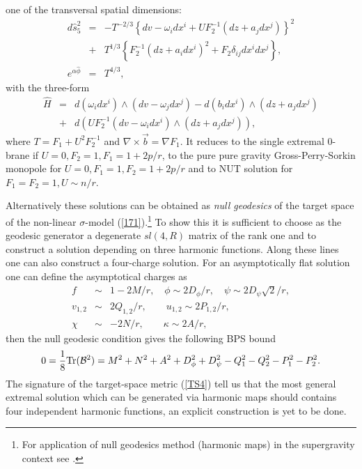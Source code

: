 \documentclass[a4paper,12pt]{article}
\def\Tr{{\rm Tr}}
\begin{document}
one of the transversal spatial dimensions:
\begin{eqnarray}
d\hat s_{5}^2 &=& -T^{-2/3} \left\{ dv - \omega_i dx^i + U
F_2^{-1}(dz + a_j dx^j) \right\}^2 \nonumber\\
&+& T^{1/3} \left\{ F_2^{-1} (dz + a_i dx^i)^2 + F_2 \delta_{ij}
dx^i dx^j \right\}, \\
e^{\alpha\hat\phi} &=& T^{4/3}, \label{NMK}
\end{eqnarray}
with the three-form
\begin{eqnarray}
\hat H &=& d (\omega_i dx^i) \wedge (dv - \omega_j dx^j) - d (b_i
dx^i) \wedge (dz + a_j dx^j) \nonumber \\
&+& d \left( U F_2^{-1} (dv - \omega_i dx^i) \wedge (dz + a_j
dx^j) \right),
\end{eqnarray}
where $T=F_1+U^2F_2^{-1}$ and $\nabla \times \vec b = \nabla
F_1$. It reduces to the single extremal $0$-brane if $U=0,
F_2=1, F_1=1+2p/r$, to the pure pure gravity Gross-Perry-Sorkin
monopole for $U=0, F_1=1, F_2=1+2p/r$ and to NUT solution for
$F_1=F_2=1, U\sim n/r$.

Alternatively these solutions can be obtained as {\it null
geodesics} of the target space of the non-linear $\sigma$-model
(\ref{171}).\footnote{For application of null geodesics method
(harmonic maps) in the supergravity context see
\cite{GaRy98,ClGa96}.} To show this it is sufficient to choose as
the geodesic generator a degenerate $sl(4,R)$ matrix of the rank
one and to construct a solution depending on three harmonic
functions. Along these lines one can also construct a four-charge
solution. For an asymptotically flat solution one can define the
asymptotical charges as
\begin{eqnarray}
f &\sim& 1-2M/r, \quad \phi \sim 2D_\phi/r, \quad
\psi \sim 2D_\psi\sqrt{2}/r, \nonumber\\
v_{1,2} &\sim& 2Q_{1,2}/r, \qquad u_{1,2} \sim 2P_{1,2}/r, \\
\chi &\sim& -2N/r, \qquad \kappa \sim 2A/r, \nonumber
\end{eqnarray}
then the null geodesic condition gives the following BPS bound
\begin{equation}
0 = \frac18 \Tr({\cal B}^2) = M^2 + N^2 + A^2 + D_\phi^2 +
D_\psi^2 - Q_1^2 - Q_2^2 - P_1^2 - P_2^2.
\end{equation}
The signature of the target-space metric (\ref{TS4}) tell us that
the most general extremal solution which can be generated via
harmonic maps should contains four independent harmonic
functions, an explicit construction is yet to be done.
\end{document}
